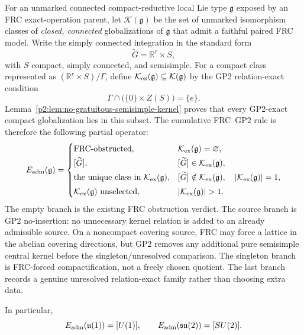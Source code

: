 \documentclass[12pt,a4paper]{article}
\begin{document}
\begin{proposition}
\label{p2:prop:admissible-globalization-operator}
For an unmarked connected compact-reductive local Lie type
\(\mathfrak g\) exposed by an FRC exact-operation parent, let
\(\mathcal K(\mathfrak g)\) be the set of unmarked isomorphism classes of
\emph{closed, connected} globalizations of \(\mathfrak g\) that admit a
faithful paired FRC model.  Write the simply connected integration in the
standard form
\[
       \widetilde G=\mathbb R^r\times S,
\]
with \(S\) compact, simply connected, and semisimple.  For a compact
class represented as \((\mathbb R^r\times S)/\Gamma\), define
\(\mathcal K_{\rm ex}(\mathfrak g)\subseteq\mathcal K(\mathfrak g)\) by the
GP2 relation-exact condition
\[
       \Gamma\cap\bigl(\{0\}\times Z(S)\bigr)=\{e\}.
\]
Lemma~\ref{p2:lem:no-gratuitous-semisimple-kernel} proves that every
GP2-exact compact globalization lies in this subset.  The cumulative FRC--GP2
rule is therefore the following partial operator:
\[
 E_{\rm adm}(\mathfrak g)=
 \begin{cases}
 \text{FRC-obstructed},
   & \mathcal K_{\rm ex}(\mathfrak g)=\varnothing,\\[0.3em]
 [\widetilde G],
   & [\widetilde G]\in\mathcal K_{\rm ex}(\mathfrak g),\\[0.3em]
 \text{the unique class in }\mathcal K_{\rm ex}(\mathfrak g),
   & [\widetilde G]\notin\mathcal K_{\rm ex}(\mathfrak g),\quad
     |\mathcal K_{\rm ex}(\mathfrak g)|=1,\\[0.3em]
 \mathcal K_{\rm ex}(\mathfrak g)\text{ unselected},
   & |\mathcal K_{\rm ex}(\mathfrak g)|>1.
 \end{cases}
\]
The empty branch is the existing FRC obstruction verdict.  The source branch
is GP2 no-insertion: no unnecessary kernel relation is added to an already
admissible source.  On a noncompact covering source, FRC may force a lattice
in the abelian covering directions, but GP2 removes any additional pure
semisimple central kernel before the singleton/unresolved comparison.  The
singleton branch is FRC-forced compactification, not a freely chosen quotient.
The last branch records a genuine unresolved relation-exact family rather than
choosing extra data.

In particular,
\[
 E_{\rm adm}(\mathfrak u(1))=[U(1)],
 \qquad
 E_{\rm adm}(\mathfrak{su}(2))=[SU(2)].
\]
\end{proposition}
\end{document}
